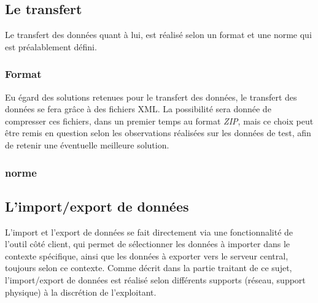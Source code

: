 \subsection{Le transfert}
Le transfert des données quant à lui, est réalisé selon un format et une norme qui est préalablement défini.

\subsubsection{Format}
Eu égard des solutions retenues pour le transfert des données, le transfert des données se fera grâce à des fichiers XML.
La possibilité sera donnée de compresser ces fichiers, dans un premier temps au format \emph{ZIP}, mais ce choix peut être remis en question selon les observations réalisées sur les données de test, afin de retenir une éventuelle meilleure solution.

\subsubsection{norme}
% 
% 

\subsection{L'import/export de données}
L'import et l'export de données se fait directement via une fonctionnalité de l'outil côté client, qui permet de sélectionner les données à importer dans le contexte spécifique, ainsi que les données à exporter vers le serveur central, toujours selon ce contexte.
Comme décrit dans la partie traitant de ce sujet, l'import/export de données est réalisé selon différents supports (réseau, support physique) à la discrétion de l'exploitant.
